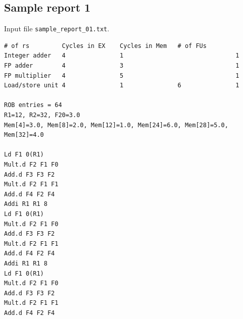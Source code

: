 \documentclass[11pt]{article}
\begin{document}
\subsection{Sample report 1}
Input file \texttt{sample\_report\_01.txt}.
\begin{Verbatim}[fontsize=\footnotesize]
               # of rs         Cycles in EX    Cycles in Mem   # of FUs
Integer adder   4               1                               1
FP adder        4               3                               1
FP multiplier   4               5                               1
Load/store unit 4               1               6               1

ROB entries = 64
R1=12, R2=32, F20=3.0
Mem[4]=3.0, Mem[8]=2.0, Mem[12]=1.0, Mem[24]=6.0, Mem[28]=5.0, Mem[32]=4.0

Ld F1 0(R1)
Mult.d F2 F1 F0
Add.d F3 F3 F2
Mult.d F2 F1 F1
Add.d F4 F2 F4
Addi R1 R1 8
Ld F1 0(R1)
Mult.d F2 F1 F0
Add.d F3 F3 F2
Mult.d F2 F1 F1
Add.d F4 F2 F4
Addi R1 R1 8
Ld F1 0(R1)
Mult.d F2 F1 F0
Add.d F3 F3 F2
Mult.d F2 F1 F1
Add.d F4 F2 F4
\end{Verbatim}
\end{document}
